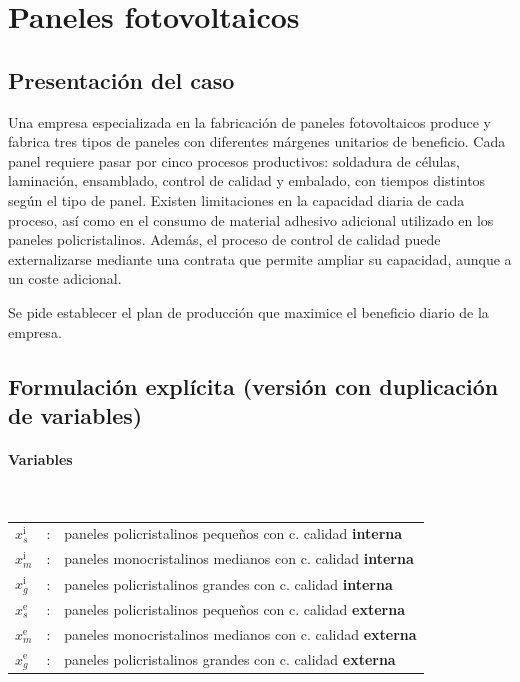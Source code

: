\section{Paneles fotovoltaicos}

\subsection{Presentación del caso}
Una empresa especializada en la fabricación de paneles fotovoltaicos produce y fabrica tres tipos de paneles con diferentes márgenes unitarios de beneficio.  
Cada panel requiere pasar por cinco procesos productivos: soldadura de células, laminación, ensamblado, control de calidad y embalado, con tiempos distintos según el tipo de panel.  
Existen limitaciones en la capacidad diaria de cada proceso, así como en el consumo de material adhesivo adicional utilizado en los paneles policristalinos.  
Además, el proceso de control de calidad puede externalizarse mediante una contrata que permite ampliar su capacidad, aunque a un coste adicional.  

Se pide establecer el plan de producción que maximice el beneficio diario de la empresa.

\subsection{Formulación explícita (versión con duplicación de variables)}

\paragraph{Variables}\mbox{}\\
\begin{tabular}{l c l}
  $x_s^{\mathrm{i}}$ & : & paneles policristalinos pequeños con c. calidad \textbf{interna}\\
  $x_m^{\mathrm{i}}$ & : & paneles monocristalinos medianos con c. calidad \textbf{interna}\\
  $x_g^{\mathrm{i}}$ & : & paneles policristalinos grandes con c. calidad \textbf{interna}\\
  $x_s^{\mathrm{e}}$ & : & paneles policristalinos pequeños con c. calidad \textbf{externa}\\
  $x_m^{\mathrm{e}}$ & : & paneles monocristalinos medianos con c. calidad \textbf{externa}\\
  $x_g^{\mathrm{e}}$ & : & paneles policristalinos grandes con c. calidad \textbf{externa}\\
\end{tabular}

